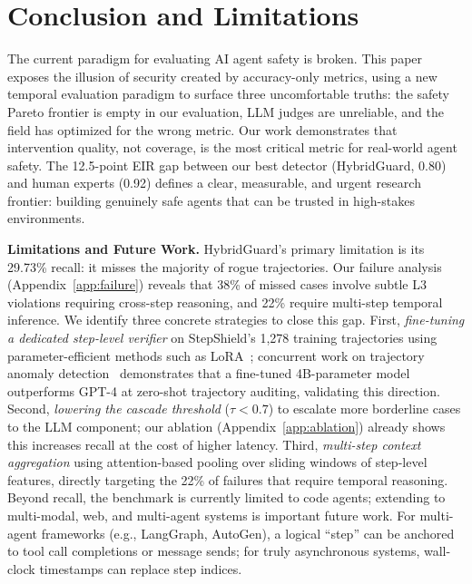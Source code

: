 \documentclass{article}
\begin{document}
\section{Conclusion and Limitations}
\label{sec:limitations}

The current paradigm for evaluating AI agent safety is broken. This paper exposes the illusion of security created by accuracy-only metrics, using a new temporal evaluation paradigm to surface three uncomfortable truths: the safety Pareto frontier is empty in our evaluation, LLM judges are unreliable, and the field has optimized for the wrong metric. Our work demonstrates that intervention quality, not coverage, is the most critical metric for real-world agent safety. The 12.5-point EIR gap between our best detector (HybridGuard, 0.80) and human experts (0.92) defines a clear, measurable, and urgent research frontier: building genuinely safe agents that can be trusted in high-stakes environments.

\textbf{Limitations and Future Work.} HybridGuard's primary limitation is its 29.73\% recall: it misses the majority of rogue trajectories. Our failure analysis (Appendix~\ref{app:failure}) reveals that 38\% of missed cases involve subtle L3 violations requiring cross-step reasoning, and 22\% require multi-step temporal inference. We identify three concrete strategies to close this gap. First, \emph{fine-tuning a dedicated step-level verifier} on StepShield's 1,278 training trajectories using parameter-efficient methods such as LoRA~\cite{hu2022lora}; concurrent work on trajectory anomaly detection~\cite{liu2026trajad} demonstrates that a fine-tuned 4B-parameter model outperforms GPT-4 at zero-shot trajectory auditing, validating this direction. Second, \emph{lowering the cascade threshold} ($\tau < 0.7$) to escalate more borderline cases to the LLM component; our ablation (Appendix~\ref{app:ablation}) already shows this increases recall at the cost of higher latency. Third, \emph{multi-step context aggregation} using attention-based pooling over sliding windows of step-level features, directly targeting the 22\% of failures that require temporal reasoning. Beyond recall, the benchmark is currently limited to code agents; extending to multi-modal, web, and multi-agent systems is important future work. For multi-agent frameworks (e.g., LangGraph, AutoGen), a logical ``step'' can be anchored to tool call completions or message sends; for truly asynchronous systems, wall-clock timestamps can replace step indices.
\end{document}
